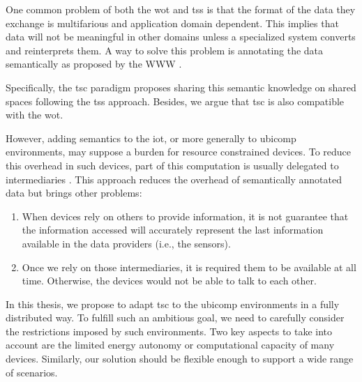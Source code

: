 \medskip

One common problem of both the \ac{wot} and \aclp{ts} is that the format of the data they exchange is multifarious and application domain dependent.
This implies that data will not be meaningful in other domains unless a specialized system converts and reinterprets them.
A way to solve this problem is annotating the data semantically as proposed by the WWW \citep{berners-lee_semantic_2001}.

Specifically, the \ac{tsc} paradigm \citep{fensel_triple-space_2004} proposes sharing this semantic knowledge on shared spaces following the \aclp{ts} approach.
Besides, we argue that \ac{tsc} is also compatible with the \ac{wot}.

However, adding semantics to the \ac{iot}, or more generally to \ac{ubicomp} environments, may suppose a burden for resource constrained devices.
To reduce this overhead in such devices, part of this computation is usually delegated to intermediaries \citep{honkola_smart-m3_2010}. %
This approach reduces the overhead of semantically annotated data but brings other problems:
\begin{enumerate}
 \item When devices rely on others to provide information, it is not guarantee that the information accessed will accurately represent the last information available in the data providers (i.e., the sensors).
 \item Once we rely on those intermediaries, it is required them to be available at all time. Otherwise, the devices would not be able to talk to each other.
\end{enumerate}

In this thesis, we propose to adapt \ac{tsc} to the \ac{ubicomp} environments in a fully distributed way.
To fulfill such an ambitious goal, we need to carefully consider the restrictions imposed by such environments.
Two key aspects to take into account are the limited energy autonomy or computational capacity of many devices.
Similarly, our solution should be flexible enough to support a wide range of scenarios.

